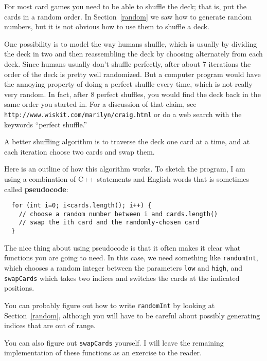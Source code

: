 For most card games you need to be able to shuffle the deck;
that is, put the cards in a random order.  In Section~\ref{random}
we saw how to generate random numbers, but it is not obvious how
to use them to shuffle a deck.

One possibility is to model the way humans shuffle, which is usually
by dividing the deck in two and then reassembling the deck by choosing
alternately from each deck.  Since humans usually don't shuffle
perfectly, after about 7 iterations the order of the deck is pretty
well randomized.  But a computer program would have the annoying
property of doing a perfect shuffle every time, which is not really
very random.  In fact, after 8 perfect shuffles, you would find the
deck back in the same order you started in.  For a discussion of that
claim, see {\tt http://www.wiskit.com/marilyn/craig.html} or do a web
search with the keywords ``perfect shuffle.''

A better shuffling algorithm is to traverse the deck one card at a
time, and at each iteration choose two cards and swap them.


Here is an outline of how this algorithm works.  To sketch the
program, I am using a combination of C++ statements and English
words that is sometimes called {\bf pseudocode}:

\begin{verbatim}
  for (int i=0; i<cards.length(); i++) {
    // choose a random number between i and cards.length()
    // swap the ith card and the randomly-chosen card
  }
\end{verbatim}
%
The nice thing about using pseudocode is that it often makes it
clear what functions you are going to need.  In this case, we
need something like {\tt randomInt}, which chooses a random
integer between the parameters {\tt low} and {\tt high},
and {\tt swapCards} which takes two indices and switches the
cards at the indicated positions.


You can probably figure out how to write {\tt randomInt}
by looking at Section~\ref{random}, although you will have to
be careful about possibly generating indices that are out of range.


You can also figure out {\tt swapCards} yourself.
I will leave the remaining implementation of these functions
as an exercise to the reader.

